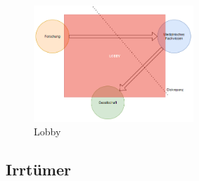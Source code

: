 \documentclass[xcolor=dvipsnames]{beamer}
\begin{document}
\begin{frame}[allowframebreaks]
        \begin{figure}
            \centering
            \includegraphics[width=6cm]{../images/wissensgesellschaft_4.png}
            \caption{Lobby}
        \end{figure}

    \end{frame}

    \subsection{Irrtümer}
\end{document}
